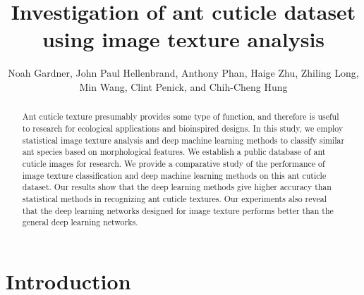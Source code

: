\documentclass{aci}
\numberwithin{equation}{section}
\begin{document}
\title{Investigation of ant cuticle dataset using image texture
    analysis}

\author{%
    Noah Gardner,
    John Paul Hellenbrand,
    Anthony Phan,
    Haige Zhu,
    Zhiling Long,
    Min Wang,
    Clint Penick,
    and Chih-Cheng Hung\corrauth
}%


\address{%
}


\begin{abstract}
    Ant cuticle texture presumably provides some type of function, and therefore
    is useful to research for ecological applications and bioinspired designs.
    In this study, we employ statistical image texture analysis and deep machine
    learning methods to classify similar ant species based on morphological
    features. We establish a public database of ant cuticle images for research.
    We provide a comparative study of the performance of image texture
    classification and deep machine learning methods on this ant cuticle dataset.
    Our results show that the deep learning methods give higher accuracy than
    statistical methods in recognizing ant cuticle textures. Our experiments
    also reveal that the deep learning networks designed for image texture
    performs better than the general deep learning networks.
\end{abstract}
\maketitle

\section{Introduction}
\end{document}
